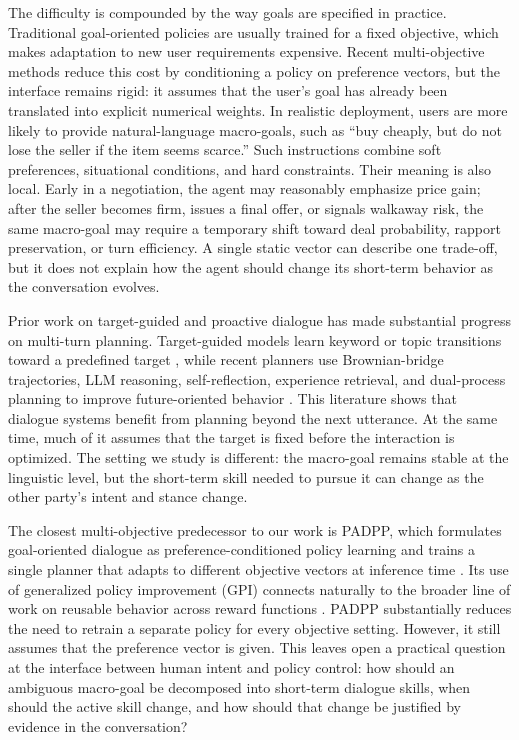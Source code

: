 \documentclass[conference]{IEEEtran}
\begin{document}
The difficulty is compounded by the way goals are specified in practice.
Traditional goal-oriented policies are usually trained for a fixed objective,
which makes adaptation to new user requirements expensive. Recent
multi-objective methods reduce this cost by conditioning a policy on preference
vectors, but the interface remains rigid: it assumes that the user's goal has
already been translated into explicit numerical weights. In realistic
deployment, users are more likely to provide natural-language macro-goals, such
as ``buy cheaply, but do not lose the seller if the item seems scarce.'' Such
instructions combine soft preferences, situational conditions, and hard
constraints. Their meaning is also local. Early in a negotiation, the agent may
reasonably emphasize price gain; after the seller becomes firm, issues a final
offer, or signals walkaway risk, the same macro-goal may require a temporary
shift toward deal probability, rapport preservation, or turn efficiency. A
single static vector can describe one trade-off, but it does not explain how
the agent should change its short-term behavior as the conversation evolves.

Prior work on target-guided and proactive dialogue has made substantial
progress on multi-turn planning. Target-guided models learn keyword or topic
transitions toward a predefined target
\cite{tang-etal-2019-target,qin2020dynamic,zhong2021keyword,kishinami-etal-2022-target,yang-etal-2022-topkg},
while recent planners use Brownian-bridge trajectories, LLM reasoning,
self-reflection, experience retrieval, and dual-process planning to improve
future-oriented behavior
\cite{wang-etal-2023-dialogue,zheng-etal-2024-thoughts,guo-etal-2024-pcqpr,dao-etal-2024-experience,he2024planning}.
This literature shows that dialogue systems benefit from planning beyond the
next utterance. At the same time, much of it assumes that the target is fixed
before the interaction is optimized. The setting we study is different: the
macro-goal remains stable at the linguistic level, but the short-term skill
needed to pursue it can change as the other party's intent and stance change.

The closest multi-objective predecessor to our work is PADPP, which formulates
goal-oriented dialogue as preference-conditioned policy learning and trains a
single planner that adapts to different objective vectors at inference time
\cite{dao-liao-2025-one}. Its use of generalized policy improvement (GPI)
connects naturally to the broader line of work on reusable behavior across
reward functions \cite{barreto2017successor,barreto2018transfer}. PADPP
substantially reduces the need to retrain a separate policy for every objective
setting. However, it still assumes that the preference vector is given. This
leaves open a practical question at the interface between human intent and
policy control: how should an ambiguous macro-goal be decomposed into
short-term dialogue skills, when should the active skill change, and how should
that change be justified by evidence in the conversation?
\end{document}
